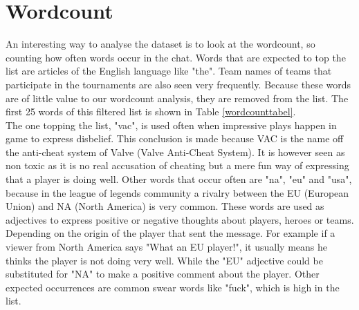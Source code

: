 \documentclass[final]{report}
\begin{document}
\noindent
\begin{minipage}{.5\textwidth}
  
\section{Wordcount}
An interesting way to analyse the dataset is to look at the wordcount, so counting how often words occur in the chat. Words that are expected to top the list are articles of the English language like "the". Team names of teams that participate in the tournaments are also seen very frequently. Because these words are of little value to our wordcount analysis, they are removed from the list. The first 25 words of this filtered list is shown in Table \ref{wordcounttabel}.\\
The one topping the list, "vac", is used often when impressive plays happen in game to express disbelief. This conclusion is made because VAC is the name off the anti-cheat system of Valve (Valve Anti-Cheat System). It is however seen as non toxic as it is no real accusation of cheating but a mere fun way of expressing that a player is doing well.
Other words that occur often are "na", "eu" and "usa", because in the league of legends community a rivalry between the EU (European Union) and NA (North America) is very common. These words are used as adjectives to express positive or negative thoughts about players, heroes or teams. Depending on the origin of the player that sent the message. For example if a viewer from North America says "What an EU player!", it usually means he thinks the player is not doing very well. While the "EU" adjective could be substituted for "NA" to make a positive comment about the player. Other expected occurrences are common swear words like "fuck", which is high in the list. \\


\end{minipage}%
\end{document}
